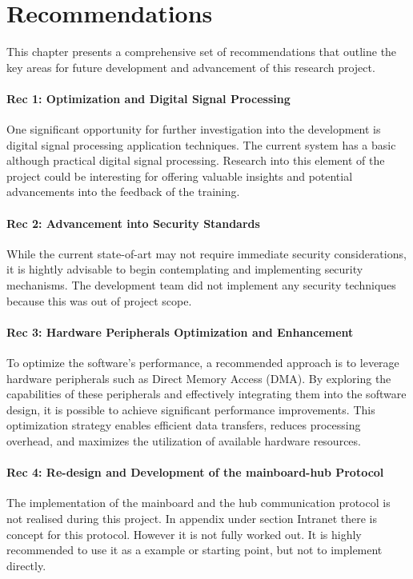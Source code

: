 \chapter{Recommendations}
\label{chapter:rec}

This chapter presents a comprehensive set of recommendations that outline the key areas for future development and advancement of this research project.\\
\subsubsection*{Rec 1: Optimization and Digital Signal Processing}
One significant opportunity for further investigation into the development is digital signal processing application techniques. The current system has a basic although practical digital signal processing. Research into this element of the project could be interesting for offering valuable insights and potential advancements into the feedback of the training.
\subsubsection*{Rec 2: Advancement into Security Standards}
While the current state-of-art may not require immediate security considerations, it is hightly advisable to begin contemplating and implementing security mechanisms. The development team did not implement any security techniques because this was out of project scope.  
\subsubsection*{Rec 3: Hardware Peripherals Optimization and Enhancement}
To optimize the software's performance, a recommended approach is to leverage hardware peripherals such as Direct Memory Access (DMA). By exploring the capabilities of these peripherals and effectively integrating them into the software design, it is possible to achieve significant performance improvements. This optimization strategy enables efficient data transfers, reduces processing overhead, and maximizes the utilization of available hardware resources.
\subsubsection*{Rec 4: Re-design and Development of the mainboard-hub Protocol}
The implementation of the mainboard and the hub communication protocol is not realised during this project. In appendix under section Intranet there is concept for this protocol. However it is not fully worked out. It is highly recommended to use it as a example or starting point, but not to implement directly.